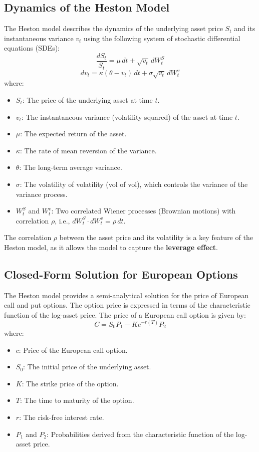 \documentclass[11pt, oneside, a4paper, titlepage]{report}
\begin{document}
\subsection{Dynamics of the Heston Model}

The Heston model describes the dynamics of the underlying asset price \( S_t \) and its instantaneous variance \( v_t \) using the following system of stochastic differential equations (SDEs):
\[
\frac{dS_t}{S_t} = \mu \, dt + \sqrt{v_t} \, dW_t^S
\]
\[
dv_t = \kappa (\theta - v_t) \, dt + \sigma \sqrt{v_t} \, dW_t^v
\]
where:
\begin{itemize}
    \item \( S_t \): The price of the underlying asset at time \( t \).
    \item \( v_t \): The instantaneous variance (volatility squared) of the asset at time \( t \).
    \item \( \mu \): The expected return of the asset.
    \item \( \kappa \): The rate of mean reversion of the variance.
    \item \( \theta \): The long-term average variance.
    \item \( \sigma \): The volatility of volatility (vol of vol), which controls the variance of the variance process.
    \item \( W_t^S \) and \( W_t^v \): Two correlated Wiener processes (Brownian motions) with correlation \( \rho \), i.e., \( dW_t^S \cdot dW_t^v = \rho \, dt \).
\end{itemize}

The correlation \( \rho \) between the asset price and its volatility is a key feature of the Heston model, as it allows the model to capture the \textbf{leverage effect}.

\subsection{Closed-Form Solution for European Options}

The Heston model provides a semi-analytical solution for the price of European call and put options. The option price is expressed in terms of the characteristic function of the log-asset price. The price of a European call option is given by:
\[
C = S_0 P_1 - K e^{-r(T)} P_2
\]
where:
\begin{itemize}
    \item \( c \): Price of the European call option.
    \item \( S_0 \): The initial price of the underlying asset.
    \item \( K \): The strike price of the option.
    \item \( T \): The time to maturity of the option.
    \item \( r \): The risk-free interest rate.
    \item \( P_1 \) and \( P_2 \): Probabilities derived from the characteristic function of the log-asset price.
\end{itemize}
\end{document}
